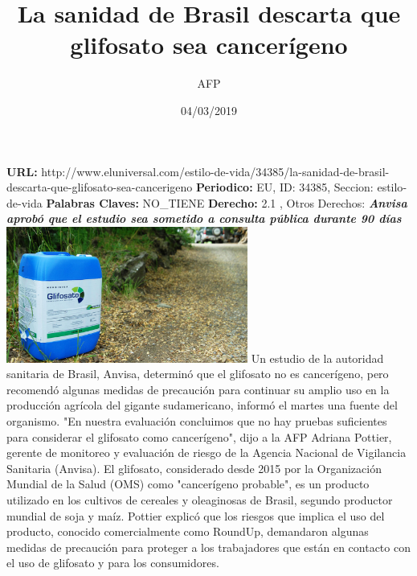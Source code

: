 \documentclass{article}%
\title{\textbf{La sanidad de Brasil descarta que glifosato sea cancerígeno}}%
\author{AFP}%
\date{04/03/2019}%
\begin{document}
%
\normalsize%
\maketitle%
\textbf{URL: }%
http://www.eluniversal.com/estilo{-}de{-}vida/34385/la{-}sanidad{-}de{-}brasil{-}descarta{-}que{-}glifosato{-}sea{-}cancerigeno\newline%
%
\textbf{Periodico: }%
EU, %
ID: %
34385, %
Seccion: %
estilo{-}de{-}vida\newline%
%
\textbf{Palabras Claves: }%
NO\_TIENE\newline%
%
\textbf{Derecho: }%
2.1%
, Otros Derechos: %
\newline%
%
\textbf{\textit{Anvisa aprobó que el estudio sea sometido a consulta pública durante 90 días}}%
\newline%
\newline%
%
\includegraphics[width=300px]{EU_34385.jpg}%
\newline%
%
Un estudio de la autoridad sanitaria de Brasil, Anvisa, determinó que el glifosato no es cancerígeno, pero recomendó algunas medidas de precaución para continuar su amplio uso en la producción agrícola del gigante sudamericano, informó el martes una fuente del organismo.%
\newline%
%
"En nuestra evaluación concluimos que no hay pruebas suficientes para considerar el glifosato como cancerígeno", dijo a la AFP Adriana Pottier, gerente de monitoreo y evaluación de riesgo de la Agencia Nacional de Vigilancia Sanitaria (Anvisa).%
\newline%
%
El glifosato, considerado desde 2015 por la Organización Mundial de la Salud (OMS) como "cancerígeno probable", es un producto utilizado en los cultivos de cereales y oleaginosas de Brasil, segundo productor mundial de soja y maíz.%
\newline%
%
Pottier explicó que los riesgos que implica el uso del producto, conocido comercialmente como RoundUp, demandaron algunas medidas de precaución para proteger a los trabajadores que están en contacto con el uso de glifosato y para los consumidores.%
\end{document}
